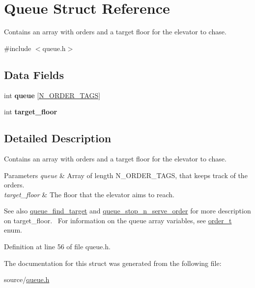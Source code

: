 \hypertarget{structQueue}{}\section{Queue Struct Reference}
\label{structQueue}


Contains an array with orders and a target floor for the elevator to chase.  




{\ttfamily \#include $<$queue.\+h$>$}

\subsection*{Data Fields}
\begin{DoxyCompactItemize}
\item 
\mbox{\label{structQueue_a5009d22561b0a1f0b94883331e98337f}} 
int {\bfseries queue} \mbox{[}\mbox{\hyperlink{queue_8h_a6c7dd10fb53eaa1cb9705e4ee36f5fcba468de5038698a54ae672a7879f92bc05}{N\+\_\+\+O\+R\+D\+E\+R\+\_\+\+T\+A\+GS}}\mbox{]}
\item 
\mbox{\label{structQueue_a95698e7080ed2265155b7bad70e7cdd7}} 
int {\bfseries target\+\_\+floor}
\end{DoxyCompactItemize}


\subsection{Detailed Description}
Contains an array with orders and a target floor for the elevator to chase. 


\begin{DoxyParams}{Parameters}
{\em queue} & Array of length N\+\_\+\+O\+R\+D\+E\+R\+\_\+\+T\+A\+GS, that keeps track of the orders. \\
\hline
{\em target\+\_\+floor} & The floor that the elevator aims to reach.\\
\hline
\end{DoxyParams}
\begin{DoxySeeAlso}{See also}
\mbox{\hyperlink{queue_8h_ae1f1f6105b668e5722bd779a25a2439d}{queue\+\_\+find\+\_\+target}} and \mbox{\hyperlink{queue_8h_a6246a25fc3b07b678c031c3dd798e077}{queue\+\_\+stop\+\_\+n\+\_\+serve\+\_\+order}} for more description on {\ttfamily target\+\_\+floor}.~\newline
For information on the {\ttfamily queue} array variables, see \mbox{\hyperlink{queue_8h_a6c7dd10fb53eaa1cb9705e4ee36f5fcb}{order\+\_\+t}} enum. 
\end{DoxySeeAlso}


Definition at line 56 of file queue.\+h.



The documentation for this struct was generated from the following file\+:\begin{DoxyCompactItemize}
\item 
source/\mbox{\hyperlink{queue_8h}{queue.\+h}}\end{DoxyCompactItemize}
